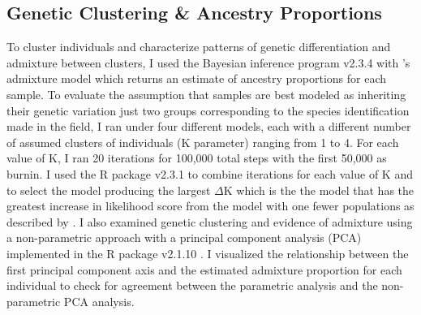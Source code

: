 \subsection{Genetic Clustering \& Ancestry Proportions}
To cluster individuals and characterize patterns of genetic differentiation and 
admixture between clusters, I used the Bayesian inference program 
\structure v2.3.4 \parencite{pritchard2000} with \structure's 
admixture model which returns an estimate of ancestry proportions for each sample. 
To evaluate the assumption that samples are best modeled as inheriting their    
genetic variation just two groups corresponding to the species identification  
made in the field, I ran \structure under four different models, each with a different number of 
assumed clusters of individuals (K parameter) ranging from 1 to 4. For each value of K, I 
ran 20 iterations for 100,000 total steps with the first 50,000 as burnin. 
I used the R package \pophelper v2.3.1 \parencite{francis2017} to combine
iterations for each value of K and to select the model producing the largest
$\Delta$K which is the the model that has the greatest increase in likelihood 
score from the model with one fewer populations as described by \parencite{evanno2005}.
I also examined genetic clustering and evidence of admixture using a non-parametric 
approach with a principal component analysis (PCA) implemented in the R package \adegenet v2.1.10 \parencite{jombart2008}. 
I visualized the relationship between the first principal component axis and the 
estimated admixture proportion for each individual to check for agreement  
between the parametric \structure analysis and the non-parametric PCA analysis.

